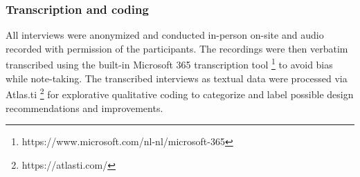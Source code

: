 \subsubsection{Transcription and coding}
All interviews were anonymized and conducted in-person on-site and audio recorded with permission of the participants. The recordings were then verbatim transcribed using the built-in Microsoft 365 transcription tool \footnote{https://www.microsoft.com/nl-nl/microsoft-365} to avoid bias while note-taking. The transcribed interviews as textual data were processed via Atlas.ti \footnote{https://atlasti.com/} for explorative qualitative coding to categorize and label possible design recommendations and improvements.